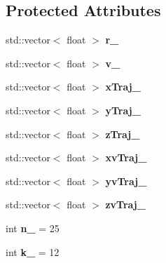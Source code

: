 \subsection*{Protected Attributes}
\begin{DoxyCompactItemize}
\item 
\hypertarget{classParticle_a497015ad2ed53ebed2a262089ccde107}{std\+::vector$<$ float $>$ {\bfseries r\+\_\+}}\label{classParticle_a497015ad2ed53ebed2a262089ccde107}

\item 
\hypertarget{classParticle_a3f899c642e1267dd1cb7bdd41b0f6dd5}{std\+::vector$<$ float $>$ {\bfseries v\+\_\+}}\label{classParticle_a3f899c642e1267dd1cb7bdd41b0f6dd5}

\item 
\hypertarget{classParticle_adfa05b5c5417e21b289b1857fc499d27}{std\+::vector$<$ float $>$ {\bfseries x\+Traj\+\_\+}}\label{classParticle_adfa05b5c5417e21b289b1857fc499d27}

\item 
\hypertarget{classParticle_ab177738e06fe1540ae97483183bf378c}{std\+::vector$<$ float $>$ {\bfseries y\+Traj\+\_\+}}\label{classParticle_ab177738e06fe1540ae97483183bf378c}

\item 
\hypertarget{classParticle_a57e310cff1c3d9db9923976b174ee71e}{std\+::vector$<$ float $>$ {\bfseries z\+Traj\+\_\+}}\label{classParticle_a57e310cff1c3d9db9923976b174ee71e}

\item 
\hypertarget{classParticle_aa36f92c74b52250b10d763358de915ac}{std\+::vector$<$ float $>$ {\bfseries xv\+Traj\+\_\+}}\label{classParticle_aa36f92c74b52250b10d763358de915ac}

\item 
\hypertarget{classParticle_a4f70038abe11ac4b0cacaffcb1ac79c4}{std\+::vector$<$ float $>$ {\bfseries yv\+Traj\+\_\+}}\label{classParticle_a4f70038abe11ac4b0cacaffcb1ac79c4}

\item 
\hypertarget{classParticle_ab6d127f3cd5cb2ced77f67af211f2563}{std\+::vector$<$ float $>$ {\bfseries zv\+Traj\+\_\+}}\label{classParticle_ab6d127f3cd5cb2ced77f67af211f2563}

\item 
\hypertarget{classParticle_ad1f245619cd50b96782a8e695668d1b2}{int {\bfseries n\+\_\+} = 25}\label{classParticle_ad1f245619cd50b96782a8e695668d1b2}

\item 
\hypertarget{classParticle_a3b6c8033f6a794aa1b5cf805c82a0bb3}{int {\bfseries k\+\_\+} = 12}\label{classParticle_a3b6c8033f6a794aa1b5cf805c82a0bb3}


\end{DoxyCompactItemize}
